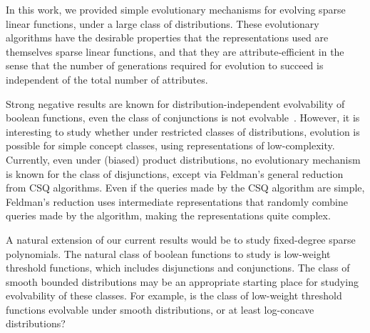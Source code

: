 In this work, we provided simple evolutionary mechanisms for evolving sparse
linear functions, under a large class of distributions. These evolutionary
algorithms have the desirable properties that the representations used are
themselves sparse linear functions, and that they are attribute-efficient in the
sense that the number of generations required for evolution to succeed is
independent of the total number of attributes.

Strong negative results are known for distribution-independent evolvability of
boolean functions, \eg even the class of conjunctions is not
evolvable~\cite{Feldman:2011-LTF}. However, it is interesting to study
whether under restricted classes of distributions, evolution is possible for
simple concept classes, using representations of low-complexity. Currently, even
under (biased) product distributions, no evolutionary mechanism is known for the
class of disjunctions, except via Feldman's general reduction from CSQ
algorithms. Even if the queries made by the CSQ algorithm are simple, Feldman's
reduction uses intermediate representations that randomly combine queries made
by the algorithm, making the representations quite complex.

A natural extension of our current results would be to study fixed-degree sparse
polynomials. The natural class of boolean functions to study is low-weight
threshold functions, which includes disjunctions and conjunctions. The class of
smooth bounded distributions may be an appropriate starting place for studying
evolvability of these classes. For example, is the class of low-weight threshold
functions evolvable under smooth distributions, or at least log-concave
distributions? 
